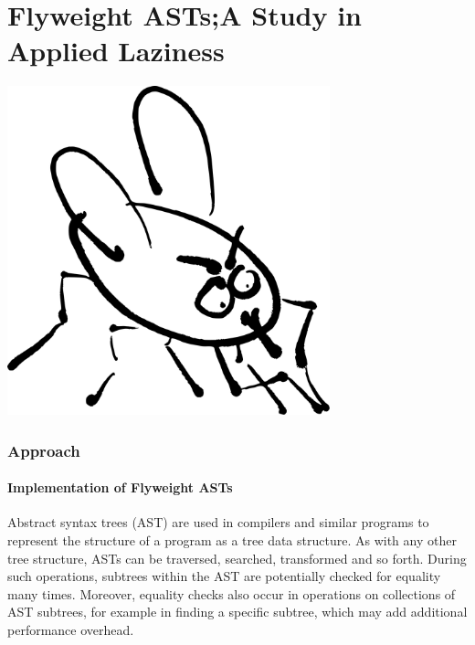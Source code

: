 \documentclass[11pt]{article}
\begin{document}
    \tableofcontents
    \newpage


    \part{Flyweight ASTs;\newline A Study in Applied Laziness}
    \begin{center}
        \vspace{3cm}
        \includegraphics[width=0.7\textwidth]{fly}
    \end{center}
    \newpage

    \section{Approach}

    \subsection{Implementation of Flyweight ASTs} \label{approach:flyweight}

    Abstract syntax trees (AST) are used in compilers and similar programs to represent
    the structure of a program as a tree data structure. As with any other tree structure,
    ASTs can be traversed, searched, transformed and so forth. During such operations,
    subtrees within the AST are potentially checked for equality many times.  Moreover, equality checks
    also occur in operations on collections of AST subtrees, for example in finding
    a specific subtree, which may add additional performance overhead.
\end{document}
